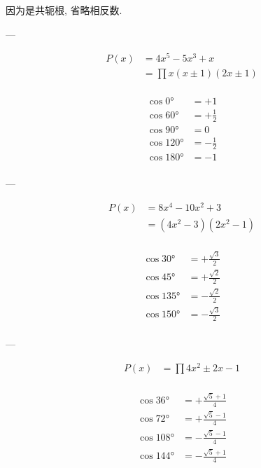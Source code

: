 \usepackage{amsmath}
\usepackage[utf8]{inputenc}
\usepackage[T1]{fontenc}


因为是共轭根, 省略相反数.

---

$$
\begin{aligned}
    P(x)
    &= 4 x^5-5 x^3+x\\
    &= \prod x(x±1)(2x±1)\\
\end{aligned}
$$

$$
\begin{aligned}
    \cos 0°   &= +1\\
    \cos 60°  &= +\frac{1}{2}\\
    \cos 90°  &= 0\\
    \cos 120° &= -\frac{1}{2}\\
    \cos 180° &= -1\\
\end{aligned}
$$

---

$$
\begin{aligned}
    P(x)
    &= 8 x^4-10 x^2+3\\
    &= \left(4 x^2-3\right) \left(2 x^2-1\right)\\
\end{aligned}
$$

$$
\begin{aligned}
    \cos 30°  &= +\frac{\sqrt{3}}{2}\\
    \cos 45°  &= +\frac{\sqrt{2}}{2}\\
    \cos 135° &= -\frac{\sqrt{2}}{2}\\
    \cos 150° &= -\frac{\sqrt{3}}{2}\\
\end{aligned}
$$

---

$$
\begin{aligned}
    P(x) &= \prod 4 x^2±2 x-1\\
\end{aligned}
$$

$$
\begin{aligned}
    \cos 36°  &= +\frac{\sqrt{5}+1}{4}\\
    \cos 72°  &= +\frac{\sqrt{5}-1}{4}\\
    \cos 108° &= -\frac{\sqrt{5}-1}{4}\\
    \cos 144° &= -\frac{\sqrt{5}+1}{4}\\
\end{aligned}
$$

